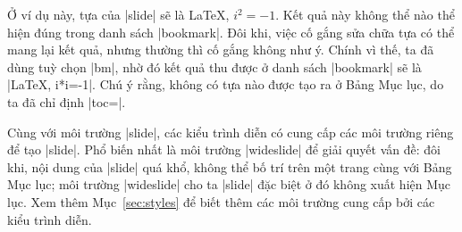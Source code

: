Ở ví dụ này, tựa của |slide| sẽ là {\color{red}\LaTeX, $i^2=-1$}.
Kết quả này không thể nào thể hiện đúng trong danh sách |bookmark|.
Đôi khi, việc cố gắng sửa chữa tựa có thể mang lại kết quả, nhưng
thường thì cố gắng không như ý. Chính vì thế, ta đã dùng tuỳ chọn |bm|,
nhờ đó kết quả thu được ở danh sách |bookmark| sẽ là |LaTeX, i*i=-1|.
Chú ý rằng, không có tựa nào được tạo ra ở Bảng Mục lục, do ta đã chỉ
định |toc=|.

Cùng với môi trường |slide|, các kiểu trình diễn có cung cấp các
môi trường riêng để tạo |slide|. Phổ biến nhất là môi trường |wideslide|
để giải quyết vấn đề: đôi khi, nội dung của |slide| quá khổ, không thể
bố trí trên một trang cùng với Bảng Mục lục; môi trường |wideslide|
cho ta |slide| đặc biệt ở đó không xuất hiện Mục lục. Xem thêm Mục~\vref{sec:styles}
để biết thêm các môi trường cung cấp bởi các kiểu trình diễn.

\endinput
